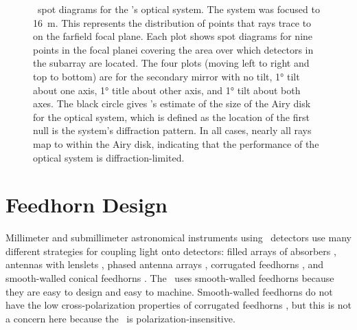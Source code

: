 \begin{figure}
\begin{tabular}{lr}
\end{tabular}
\caption{
\ZEMAX\ spot diagrams for the \Imager's optical system.
The system was focused to \SI{16}{\m}.
This represents the distribution of points that rays trace to on the farfield focal plane.
Each plot shows spot diagrams for nine points in the focal planei covering the area over which detectors in the subarray are located.
The four plots (moving left to right and top to bottom) are for the secondary mirror with no tilt, \ang{1} tilt about one axis, \ang{1} title about other axis, and \ang{1} tilt about both axes.
The black circle gives \ZEMAX's estimate of the size of the Airy disk for the optical system, which is defined as the location of the first null is the system's diffraction pattern.
In all cases, nearly all rays map to within the Airy disk, indicating that the performance of the optical system is diffraction-limited.
}
\label{fig:ch4-spot-diagrams}
\end{figure}


\section{Feedhorn Design}\label{sec:ch4-feedhorn-design}


Millimeter and submillimeter astronomical instruments using \TES\ detectors use many different strategies for coupling light onto detectors: filled arrays of absorbers \cite{swetz_overview_2011,holland_scuba-2:_2013}, antennas with lenslets \cite{keating_ultra_2011}, phased antenna arrays \cite{obrient_antenna-coupled_2012}, corrugated feedhorns \cite{austermann_sptpol:_2012,niemack_actpol:_2010}, and smooth-walled conical feedhorns \cite{schwan_invited_2011,sptxxx}.
The \Imager\ uses smooth-walled feedhorns because they are easy to design and easy to machine.
Smooth-walled feedhorns do not have the low cross-polarization properties of corrugated feedhorns \cite{clarricoats_corrugated_1984}, but this is not a concern here because the \Imager\ is polarization-insensitive.

